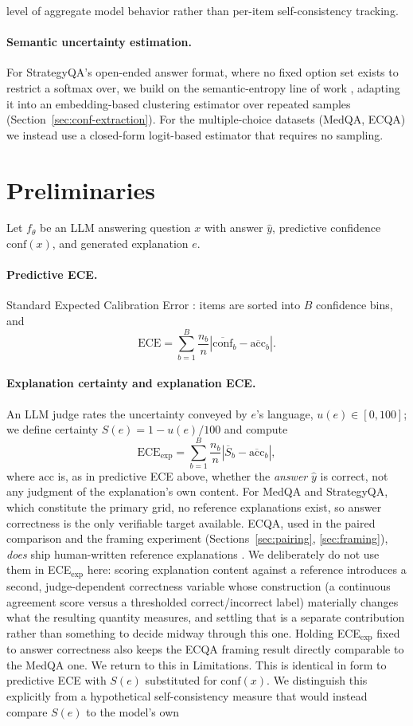 \documentclass[letterpaper]{article} %
\begin{document}
level of aggregate model behavior rather than per-item self-consistency tracking. \paragraph{Semantic uncertainty estimation.} For StrategyQA's open-ended answer format, where no fixed option set exists to restrict a softmax over, we build on the semantic-entropy line of work \citep{kuhn2023semantic,farquhar2024detecting}, adapting it into an embedding-based clustering estimator over repeated samples (Section~\ref{sec:conf-extraction}). For the multiple-choice datasets (MedQA, ECQA) we instead use a closed-form logit-based estimator that requires no sampling.

\section{Preliminaries} \label{sec:definitions} Let $f_\theta$ be an LLM answering question $x$ with answer $\hat y$, predictive confidence $\text{conf}(x)$, and generated explanation $e$. \paragraph{Predictive ECE.} Standard Expected Calibration Error \citep{guo2017calibration}: items are sorted into $B$ confidence bins, and \[ \text{ECE} = \sum_{b=1}^{B} \frac{n_b}{n} \left| \overline{\text{conf}}_b - \overline{\text{acc}}_b \right|. \] \paragraph{Explanation certainty and explanation ECE.}\label{sec:prelim-note} An LLM judge rates the uncertainty conveyed by $e$'s language, $u(e)\in[0,100]$; we define certainty $S(e) = 1-u(e)/100$ and compute \[ \text{ECE}_{\text{exp}} = \sum_{b=1}^{B} \frac{n_b}{n} \left| \overline{S}_b - \overline{\text{acc}}_b \right|, \] where $\text{acc}$ is, as in predictive ECE above, whether the \emph{answer} $\hat y$ is correct, not any judgment of the explanation's own content. For MedQA and StrategyQA, which constitute the primary grid, no reference explanations exist, so answer correctness is the only verifiable target available. ECQA, used in the paired comparison and the framing experiment (Sections~\ref{sec:pairing}, \ref{sec:framing}), \emph{does} ship human-written reference explanations \citep{aggarwaletal2021ecqa}. We deliberately do not use them in ECE$_{\text{exp}}$ here: scoring explanation content against a reference introduces a second, judge-dependent correctness variable whose construction (a continuous agreement score versus a thresholded correct/incorrect label) materially changes what the resulting quantity measures, and settling that is a separate contribution rather than something to decide midway through this one. Holding ECE$_{\text{exp}}$ fixed to answer correctness also keeps the ECQA framing result directly comparable to the MedQA one. We return to this in Limitations. This is identical in form to predictive ECE with $S(e)$ substituted for $\text{conf}(x)$. We distinguish this explicitly from a hypothetical self-consistency measure that would instead compare $S(e)$ to the model's own 
\end{document}
